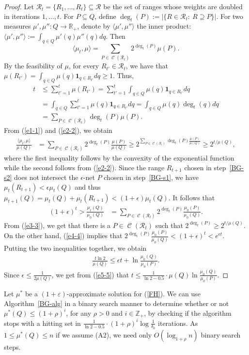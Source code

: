 \documentclass[a4paper,11pt]{article}
\def\RR{\mathbb R}
\def\ZZ{\mathbb Z}
\def\cC{\mathcal C}
\def\cR{\mathcal R}
\def\eps{\varepsilon}
\newcommand{\raf}[1]{(\ref{#1})}
\newcommand{\cells}{\operatorname{\cC}}
\newcommand{\bone}{\ensuremath{\boldsymbol{1}}}
\begin{document}
\begin{proof} Let $\cR_t=\{R_1,\ldots,R_t\}\subseteq \cR$ be the set of ranges whose weights are doubled in iterations $1,\ldots,t$. For $P\subseteq Q$, define $\deg_t(P):=|\{R\in\cR_t:~R\supseteq P\}|$.
	For two measures $\mu',\mu'':Q\to\RR_+$, denote by $\langle \mu',\mu''\rangle$ the inner product: 
	$\langle \mu',\mu''\rangle:=\int_{q\in Q}\mu'(q)\mu''(q)dq$.
	Then 
	\begin{equation}\label{e1-1}
	\langle \mu_t,\mu\rangle=\sum_{P\in\cells(\cR_t)}2^{\deg_t(P)}\mu(P).
	\end{equation}
	By the feasibility of $\mu$, for every $R_{t'} \in \cR_{t}$, we have that $\mu(R_{t'})=\int_{q\in Q}\mu(q)\bone_{q\in R_{t'}}dq \geq 1$. Thus,
	\begin{align}\label{e2-2}
	t&\le \sum_{t'=1}^t\mu(R_{t'})=\sum_{t'=1}^t\int_{q\in Q} \mu(q)\bone_{q\in R_{t'}}dq\nonumber\\
	& = \int_{q \in Q} \sum_{t'=1}^t\mu(q)\bone_{q\in R_{t'}}dq=\int_{q \in Q} \mu(q) \deg_t(q)dq\nonumber\\
	&=\sum_{P\in\cells(\cR_t)}\deg_t(P)\mu(P). 
	\end{align}
	From \raf{e1-1} and \raf{e2-2}, we obtain
	\begin{align}\label{e3-3}
	\frac{\langle \mu_t,\mu\rangle}{\mu(Q)}&=\sum_{P\in\cells(\cR_t)}2^{\deg_t(P)}\frac{\mu(P)}{\mu(Q)}
	\ge 2^{\sum_{P\in\cells(\cR_t)}\deg_t(P)\frac{\mu(P)}{\mu(Q)}}\ge 2^{t/\mu(Q)},
	\end{align}
	where the first inequality follows by the convexity of the exponential function while the second follows from \raf{e2-2}. 
	Since the range $R_{t+1}$ chosen in step~\ref{BG-s2} does not intersect the $\epsilon$-net $P$ chosen in step~\ref{BG-s1}, we have $\mu_t(R_{t+1})<\epsilon \mu_t(Q)$ and thus $\mu_{t+1}(Q)=\mu_t(Q)+\mu_t(R_{t+1})<(1+\epsilon)\mu_t(Q).$ 
	It follows that 
	\begin{align}\label{e4-4} 
	(1+\epsilon)^t>\frac{\mu_t(Q)}{\mu_0(Q)}&=\sum_{P\in\cells(\cR_t)}2^{\deg_t(P)}\frac{\mu_0(P)}{\mu_0(Q)}.
	\end{align}
	From \raf{e3-3}, we get that there is a $P\in\cells(\cR_t)$ such that $2^{\deg_t(P)}\ge 2^{t/\mu(Q)}$. On the other hand, \raf{e4-4} implies that $2^{\deg_t(P)}\frac{\mu_0(P)}{\mu_0(Q)}<(1+\epsilon)^t<e^{\epsilon t}$. Putting the two inequalities together, we obtain
	\begin{align}\label{e5-5}
	\frac{t\ln 2}{\mu(Q)}\le \epsilon t+\ln\frac{\mu_0(Q)}{\mu_0(P)}.
	\end{align}
	Since $\epsilon\le\frac{1}{2\mu(Q)}$, we get from \raf{e5-5} that $t\le \frac{1}{\ln 2-0.5}\cdot\mu(Q)\ln\frac{\mu_0(Q)}{\mu_0(P)}.$
\end{proof}
Let $\mu^*$ be a $(1+\eps)$-approximate solution for \raf{FH}. 
We can use Algorithm~\ref{BG-alg} in a binary search manner to determine whether or not $\mu^*(Q)\le(1+\rho)^i$, for any $\rho>0$ and $i\in\ZZ_+$, by checking if the algorithm stops with a hitting set in $\frac{1}{\ln 2-0.5}\cdot(1+\rho)^i\log\frac{1}{\delta_0}$ iterations. 
As $1\le \mu^*(Q)\le n$ if we assume (A2), we need only $O(\log_{1+\rho} n)$ binary search steps. 
\end{document}
